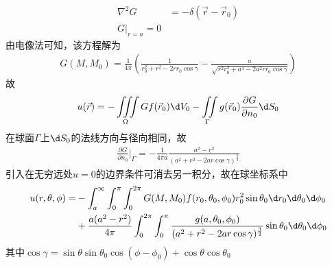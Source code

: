 \documentclass{phyasgn}
\begin{document}
\begin{sol}[3]
  \begin{align*}
    \nabla^2G&=-\delta(\vec{r}-\vec{r}_0)\\
    G|_{r=a}=0
\end{align*}
由电像法可知，该方程解为
\begin{align*}
  G(M,M_0)=\frac{1}{4\pi}\left(\frac{1}{r_0^2+r^2-2rr_0\cos\gamma}-\frac{a}{\sqrt{r^2r_0^2+a^4-2a^2rr_0\cos\gamma}}\right)
\end{align*}
故
\begin{align*}
  u(\vec{r})=-\iiint\limits_{\Omega}Gf(\vec{r}_0)\d V_0-\iint\limits_{\Gamma} g(\vec{r}_0)\frac{\partial G}{\partial n_0}\d S_0
\end{align*}
在球面$\Gamma$上$\d S_0$的法线方向与径向相同，故
\begin{align*}
  \frac{\partial G}{\partial n_0}|_{\Gamma}=-\frac{1}{4\pi a}\frac{a^2-r^2}{(a^2+r^2-2ar\cos\gamma)^\frac{3}{2}}
\end{align*}
引入在无穷远处$u=0$的边界条件可消去另一积分，故在球坐标系中
\begin{align*}
  u(r,\theta,\phi)=&-\int_{a}^{\infty}\int_{0}^{\pi}\int_{0}^{2\pi}G(M,M_0)f(r_0,\theta_0,\phi_0)r_0^2\sin\theta_0\d r_0\d\theta_0\d\phi_0\\
  &+\frac{a(a^2-r^2)}{4\pi}\int_{0}^{2\pi}\int_{0}^{\pi}\frac{g(a,\theta_0,\phi_0)}{(a^2+r^2-2ar\cos\gamma)^\frac{3}{2}}\sin\theta_0\d\theta_0\d\phi_0
\end{align*}
其中$\cos\gamma=\sin\theta\sin\theta_0\cos(\phi-\phi_0)+\cos\theta\cos\theta_0$
\end{sol}\par
\end{document}
